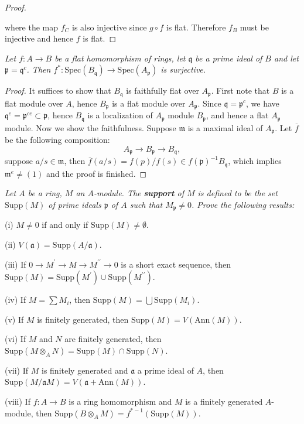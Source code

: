 \begin{proof}
\begin{center}
\begin{tikzpicture}[x=0.75pt,y=0.75pt,yscale=-1,xscale=1]
\end{tikzpicture}
\end{center}
where the map $f_C$ is also injective since $g\circ f$ is flat. Therefore $f_B$ must be injective and hence $f$ is flat.
\end{proof}
\begin{problem}\em
Let $f:A\to B$ be a flat homomorphism of rings, let $\mathfrak{q}$ be a prime ideal of $B$ and let $\mathfrak{p}=\mathfrak{q}^c$. Then $f^*:\mathrm{Spec}(B_\mathfrak{q})\to\mathrm{Spec}(A_\mathfrak{p})$ is surjective.
\end{problem}
\begin{proof}
It suffices to show that $B_\mathfrak{q}$ is faithfully flat over $A_\mathfrak{p}$. First note that $B$ is a flat module over $A$, hence $B_\mathfrak{p}$ is a flat module over $A_\mathfrak{p}$. Since $\mathfrak{q}=\mathfrak{p}^c$, we have $\mathfrak{q}^e=\mathfrak{p}^{ce}\subset\mathfrak{p}$, hence $B_\mathfrak{q}$ is a localization of $A_\mathfrak{p}$ module $B_\mathfrak{p}$, and hence a flat $A_\mathfrak{p}$ module. Now we show the faithfulness. Suppose $\mathfrak{m}$ is a maximal ideal of $A_\mathfrak{p}$. Let $\overline{f}$ be the following composition: 
$$
A_{\mathfrak{p}}\longrightarrow B_{\mathfrak{p}}\longrightarrow B_{\mathfrak{q}},
$$
suppose $a/s\in\mathfrak{m}$, then $\overline{f}(a/s)=f(p)/f(s)\in f(\mathfrak{p})^{-1}B_\mathfrak{q}$, which implies $\mathfrak{m}^e\ne (1)$ and the proof is finished.
\end{proof}
\begin{problem}\em
Let $A$ be a ring, $M$ an $A$-module. The \textbf{support} of $M$ is defined to be the set $\mathrm{Supp}(M)$ of prime ideals $\mathfrak{p}$ of $A$ such that $M_\mathfrak{p}\ne 0$. Prove the following results:\par
(i) $M\ne 0$ if and only if $\mathrm{Supp}(M)\ne\emptyset$.\par
(ii) $V(\mathfrak{a})=\mathrm{Supp}(A/\mathfrak{a})$.\par
(iii) If $0\longrightarrow M^{\prime}\longrightarrow M\longrightarrow M^{\prime\prime}\longrightarrow 0$ is a short exact sequence, then $\mathrm{Supp}(M)=\mathrm{Supp}(M^\prime)\cup\mathrm{Supp}(M^{\prime\prime})$.\par
(iv) If $M=\sum M_i$, then $\mathrm{Supp}(M)=\bigcup\mathrm{Supp}(M_i)$.\par
(v) If $M$ is finitely generated, then $\mathrm{Supp}(M)=V(\mathrm{Ann}(M))$.\par
(vi) If $M$ and $N$ are finitely generated, then $\mathrm{Supp}(M\otimes_AN)=\mathrm{Supp}(M)\cap\mathrm{Supp}(N)$.\par
(vii) If $M$ is finitely generated and $\mathfrak{a}$ a prime ideal of $A$, then $\mathrm{Supp}(M/\mathfrak{a}M)=V(\mathfrak{a}+\mathrm{Ann}(M))$.\par
(viii) If $f:A\to B$ is a ring homomorphism and $M$ is a finitely generated $A$-module, then $\mathrm{Supp}(B\otimes_AM)=f^{*-1}(\mathrm{Supp}(M))$.
\end{problem}
